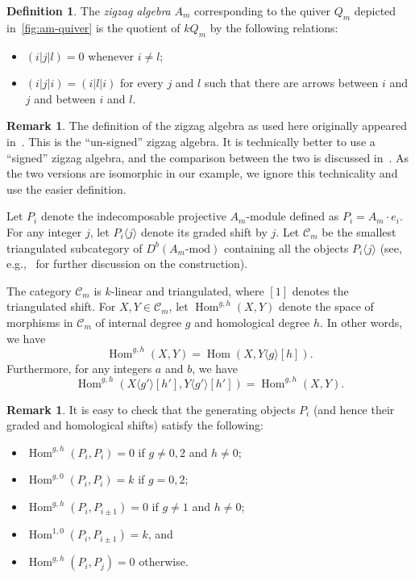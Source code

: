 \documentclass{amsart}
\theoremstyle{definition}
\newtheorem{definition}[theorem]{Definition}
\newtheorem{remark}[theorem]{Remark}
\DeclareMathOperator{\Hom}{Hom} %
\newcommand{\darkblue}{\color{darkblue}} %
\newcommand{\defn}[1]{\textsl{\darkblue #1}} %
\begin{document}
\begin{definition}
  The \defn{zigzag algebra} \(A_m\) corresponding to the quiver \(Q_m\) depicted in~\cref{fig:am-quiver} is the quotient of \(kQ_m\) by the following relations:
  \begin{itemize}
  \item \((i|j|l) = 0\) whenever \(i \neq l\);
  \item \((i|j|i) = (i|l|i)\) for every \(j\) and \(l\) such that there are arrows between \(i\) and \(j\) and between \(i\) and \(l\).
  \end{itemize}
\end{definition}

\begin{remark}
  The definition of the zigzag algebra as used here originally appeared in~\cite[Section 3]{hue.kho:01}.
  This is the ``un-signed'' zigzag algebra.
  It is technically better to use a ``signed'' zigzag algebra, and the comparison between the two is discussed in~\cite[Remark 6.6]{bap.deo.lic:20}.
  As the two versions are isomorphic in our example, we ignore this technicality and use the easier definition.
\end{remark}

Let \(P_i\) denote the indecomposable projective \(A_m\)-module defined as \(P_i = A_m\cdot e_i\).
For any integer \(j\), let \(P_i \langle j \rangle\) denote its graded shift by \(j\).
Let \(\mathcal{C}_m\) be the smallest triangulated subcategory of \(D^b(A_m\text{-mod})\) containing all the objects \(P_i\langle j \rangle\) (see, e.g.,~\cite[Section 2.3.3]{bap.deo.lic:22} for further discussion on the construction).

The category \(\mathcal{C}_m\) is \(k\)-linear and triangulated, where \([1]\) denotes the triangulated shift.
For \(X, Y \in \mathcal{C}_m\), let \(\Hom^{g,h}(X,Y)\) denote the space of morphisms in \(\mathcal{C}_m\) of internal degree \(g\) and homological degree \(h\).
In other words, we have
\[\Hom^{g,h}(X,Y) = \Hom(X,Y\langle g \rangle[h]).\]
Furthermore, for any integers \(a\) and \(b\), we have
\[\Hom^{g,h}(X\langle g' \rangle[h'], Y\langle g' \rangle[h']) = \Hom^{g,h}(X,Y).\]

\begin{remark}\label{rem:generating-morphisms}
  It is easy to check that the generating objects \(P_i\) (and hence their graded and homological shifts) satisfy the following:
  \begin{itemize}
  \item \(\Hom^{g,h}(P_i,P_i) = 0\) if \(g \neq 0, 2\) and \(h \neq 0\);
  \item \(\Hom^{g,0}(P_i,P_i) = k\) if \(g = 0, 2\);
  \item \(\Hom^{g,h}(P_i, P_{i\pm1}) = 0\) if \(g \neq 1\) and \(h \neq 0\);
  \item \(\Hom^{1,0}(P_i, P_{i\pm1}) = k\), and
  \item \(\Hom^{g,h}(P_i, P_j) = 0 \) otherwise.
  \end{itemize}
\end{remark}
\end{document}
